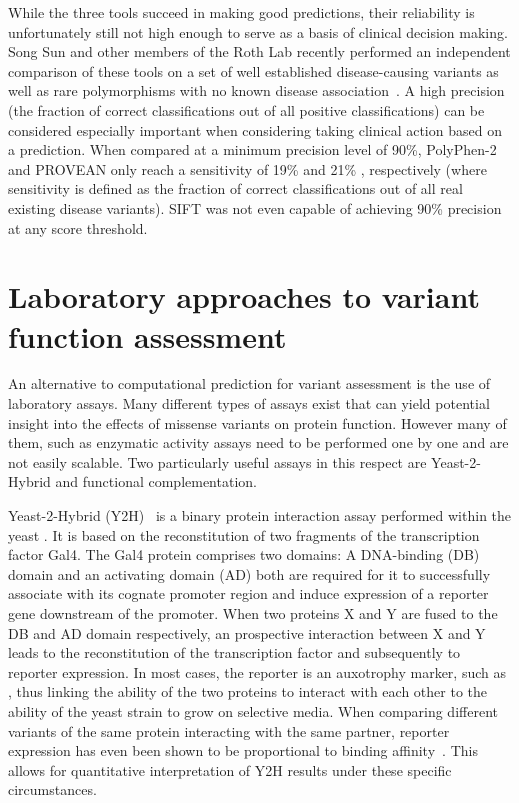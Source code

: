 While the three tools succeed in making good predictions, their reliability is unfortunately still not high enough to serve as a basis of clinical decision making. Song Sun and other members of the Roth Lab recently performed an independent comparison of these tools on a set of well established disease-causing variants as well as rare polymorphisms with no known disease association~\cite{sun_extended_2016}. A high precision (the fraction of correct classifications out of all positive classifications) can be considered especially important when considering taking clinical action based on a prediction. When compared at a minimum precision level of 90\%, PolyPhen-2 and PROVEAN only reach a sensitivity of 19\% and 21\% , respectively (where sensitivity is defined as the fraction of correct classifications out of all real existing disease variants). SIFT was not even capable of achieving 90\% precision at any score threshold.

\section{Laboratory approaches to variant function assessment}

An alternative to computational prediction for variant assessment is the use of laboratory assays. Many different types of assays exist that can yield potential insight into the effects of missense variants on protein function. However many of them, such as enzymatic activity assays need to be performed one by one and are not easily scalable. Two particularly useful assays in this respect are Yeast-2-Hybrid and functional complementation.

Yeast-2-Hybrid (Y2H)~\cite{FieldsSongY2H} is a binary protein interaction assay performed within the yeast . It is based on the reconstitution of two fragments of the transcription factor Gal4. The Gal4 protein comprises two domains: A DNA-binding (DB) domain and an activating domain (AD) both are required for it to successfully associate with its cognate promoter region and induce expression of a reporter gene downstream of the promoter. When two proteins X and Y are fused to the DB and AD domain respectively, an prospective interaction between X and Y leads to the reconstitution of the transcription factor and subsequently to reporter expression. In most cases, the reporter is an auxotrophy marker, such as , thus linking the ability of the two proteins to interact with each other to the ability of the yeast strain to grow on selective media. When comparing different variants of the same protein interacting with the same partner, reporter expression has even been shown to be proportional to binding affinity~\cite{FieldsY2HAffinity}. This allows for quantitative interpretation of Y2H results under these specific circumstances. 

